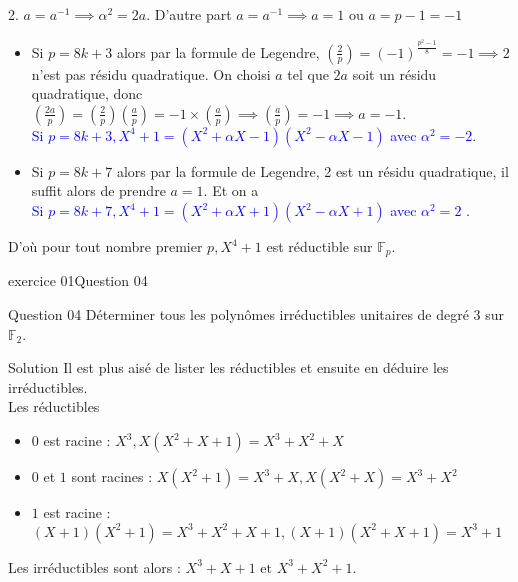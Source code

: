 \documentclass[10pt]{beamer}
\begin{document}
    \begin{frame}
        \begin{exampleblock}{}
            2. $a = a^{-1} \implies \alpha^2 = 2a$. \pause D'autre part $a = a^{-1} \implies a = 1 \text{ ou } a = p-1 = -1$
            \pause
            \begin{itemize}
                \item Si $p=8k + 3$ alors par la formule de Legendre, $(\frac{2}{p}) = (-1)^{\frac{p^2 - 1}{8}} = -1 \implies 2$ n'est pas résidu quadratique. On choisi $a$ tel que $2a$ soit un résidu quadratique, donc
                $(\frac{2a}{p}) = (\frac{2}{p})(\frac{a}{p}) = -1\times(\frac{a}{p}) \implies (\frac{a}{p}) = -1 \implies a=-1$.\\
                \pause \textcolor{blue}{Si $p=8k+3, X^4 + 1 = (X^2 + \alpha X -1)(X^2 - \alpha X - 1)$ avec $\alpha^2 = -2$}.
                \pause
                \item Si $p=8k + 7$ alors par la formule de Legendre, 2 est un résidu quadratique, il suffit alors de prendre $a=1$. Et on a \\
                \pause \textcolor{blue}{Si $p=8k+7, X^4 + 1 = (X^2 + \alpha X + 1)(X^2 - \alpha X + 1)$ avec $\alpha^2 = 2$ }.
            \end{itemize} \pause

            D'où pour tout nombre premier $p, X^4 + 1$ est réductible sur $\mathbb{F}_{p}$.
        \end{exampleblock}
    \end{frame}

    \begin{frame}{exercice 01}{Question 04}
        \begin{alertblock}{Question 04}
            Déterminer tous les polynômes irréductibles unitaires de degré 3 sur $\mathbb{F}_2$.
        \end{alertblock}
        \begin{exampleblock}{Solution}
            Il est plus aisé de lister les réductibles et ensuite en déduire les irréductibles.\\
            Les réductibles \\ \pause
            \begin{itemize}
                \item $0$ est racine : $X^3,  X(X^2 + X+1) = X^3+X^2+X$ \pause
                \item $0$ et $1$ sont racines : $X(X^2 + 1) = X^3 + X, X(X^2 + X) = X^3 + X^2$ \pause
                \item $1$ est racine : $(X+1)(X^2 + 1) = X^3 + X^2 + X + 1, (X+1)(X^2 + X + 1) = X^3 + 1$ \pause
            \end{itemize}\pause 
            Les irréductibles sont alors : $X^3 + X + 1 \text{ et } X^3 + X^2 + 1$.
        \end{exampleblock}
    \end{frame}
\end{document}

